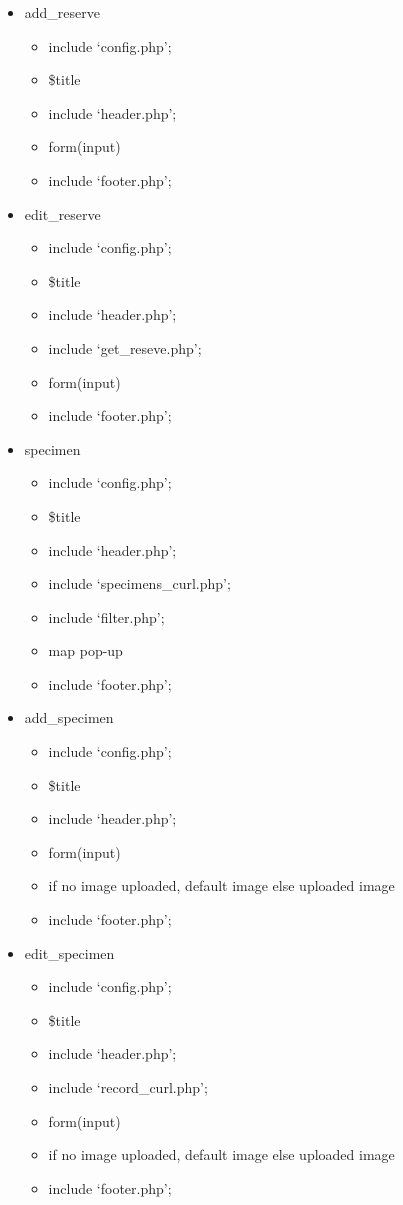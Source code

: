 \begin{itemize}
		\item add\_reserve
		\begin{itemize}
			\item include `config.php';
			\item \$title
			\item include `header.php';
			\item form(input)
			\item include `footer.php';
		\end{itemize}
		
		\item edit\_reserve
		\begin{itemize}
			\item include `config.php';
			\item \$title
			\item include `header.php';
			\item include `get\_reseve.php';
			\item form(input)
			\item include `footer.php';
		\end{itemize}
		
		\item specimen
		\begin{itemize}
			\item include `config.php';
			\item \$title
			\item include `header.php';
			\item include `specimens\_curl.php';
			\item include `filter.php';
			\item map pop-up
			\item include `footer.php';
		\end{itemize}
		
		\item add\_specimen
		\begin{itemize}
			\item include `config.php';
			\item \$title
			\item include `header.php';
			\item form(input)
			\item if no image uploaded, default image else uploaded image
			\item include `footer.php';
		\end{itemize}
		
		\item edit\_specimen
		\begin{itemize}
			\item include `config.php';
			\item \$title
			\item include `header.php';
			\item include `record\_curl.php';
			\item form(input)
			\item if no image uploaded, default image else uploaded image
			\item include `footer.php';
		\end{itemize}
		

\end{itemize}
